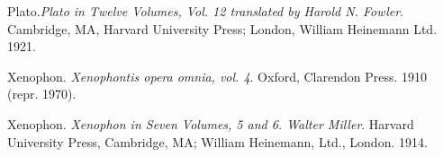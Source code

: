 \documentclass[a4paper,twocolumn,twoside,notitlepage,10pt]{article}
\begin{document}
\begin{description} %
 	\item Plato.\emph{Plato in Twelve Volumes, Vol. 12 translated by Harold N. Fowler}. Cambridge, MA, Harvard University Press; London, William Heinemann Ltd. 1921.
	\item Xenophon. \emph{Xenophontis opera omnia, vol. 4}. Oxford, Clarendon Press. 1910 (repr. 1970).
	\item Xenophon. \emph{Xenophon in Seven Volumes, 5 and 6. Walter Miller}. Harvard University Press, Cambridge, MA; William Heinemann, Ltd., London. 1914.
\end{description}

\onecolumn
\printindex[vicelist]
\printindex[eng]
\printindex[grc]

\printglossaries
\end{document}
